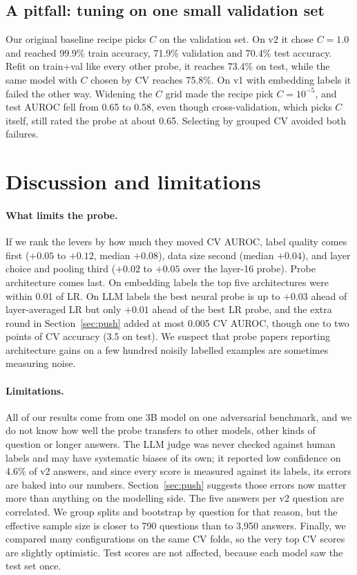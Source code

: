 \documentclass[11pt]{article}
\begin{document}
\subsection{A pitfall: tuning on one small validation set}
\label{sec:pitfall}
Our original baseline recipe picks $C$ on the validation set. On v2 it chose $C=1.0$ and reached 99.9\% train accuracy, 71.9\% validation and 70.4\% test accuracy. Refit on train+val like every other probe, it reaches 73.4\% on test, while the same model with $C$ chosen by CV reaches 75.8\%. On v1 with embedding labels it failed the other way. Widening the $C$ grid made the recipe pick $C=10^{-5}$, and test AUROC fell from 0.65 to 0.58, even though cross-validation, which picks $C$ itself, still rated the probe at about 0.65. Selecting by grouped CV avoided both failures.

\section{Discussion and limitations}
\label{sec:limits}
\paragraph{What limits the probe.} If we rank the levers by how much they moved CV AUROC, label quality comes first ($+0.05$ to $+0.12$, median $+0.08$), data size second (median $+0.04$), and layer choice and pooling third ($+0.02$ to $+0.05$ over the layer-16 probe). Probe architecture comes last. On embedding labels the top five architectures were within 0.01 of LR. On LLM labels the best neural probe is up to $+0.03$ ahead of layer-averaged LR but only $+0.01$ ahead of the best LR probe, and the extra round in Section~\ref{sec:push} added at most 0.005 CV AUROC, though one to two points of CV accuracy (3.5 on test). We suspect that probe papers reporting architecture gains on a few hundred noisily labelled examples are sometimes measuring noise.

\paragraph{Limitations.} All of our results come from one 3B model on one adversarial benchmark, and we do not know how well the probe transfers to other models, other kinds of question or longer answers. The LLM judge was never checked against human labels and may have systematic biases of its own; it reported low confidence on 4.6\% of v2 answers, and since every score is measured against its labels, its errors are baked into our numbers. Section~\ref{sec:push} suggests those errors now matter more than anything on the modelling side. The five answers per v2 question are correlated. We group splits and bootstrap by question for that reason, but the effective sample size is closer to 790 questions than to 3,950 answers. Finally, we compared many configurations on the same CV folds, so the very top CV scores are slightly optimistic. Test scores are not affected, because each model saw the test set once.
\end{document}
